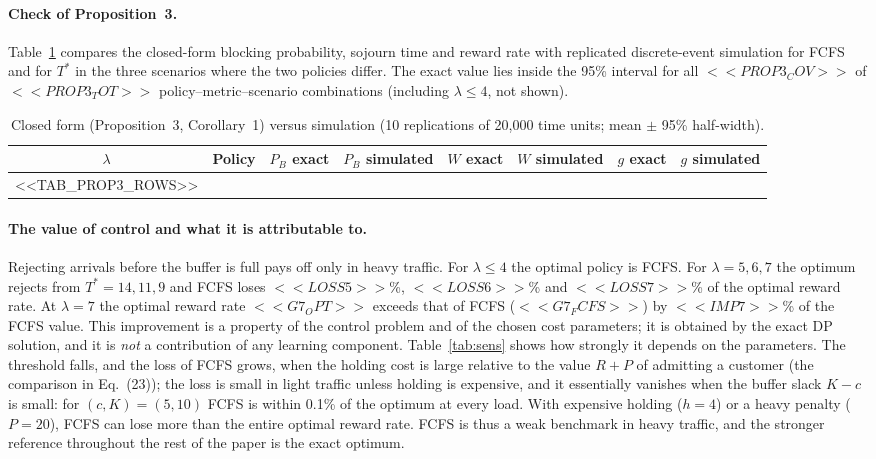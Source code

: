 \paragraph{Check of Proposition~3.} Table~\ref{tab:prop3} compares the closed-form blocking probability, sojourn time and reward rate with replicated discrete-event simulation for FCFS and for $T^*$ in the three scenarios where the two policies differ. The exact value lies inside the 95\% interval for all $<<PROP3_COV>>$ of $<<PROP3_TOT>>$ policy--metric--scenario combinations (including $\lambda\le4$, not shown).

\begin{table}[t]
\centering\small
\caption{Closed form (Proposition~3, Corollary~1) versus simulation (10 replications of 20{,}000 time units; mean $\pm$ 95\% half-width).}\label{tab:prop3}
\begin{tabular}{@{}cl cc cc cc@{}}
\toprule
$\lambda$ & Policy & $P_B$ exact & $P_B$ simulated & $W$ exact & $W$ simulated & $g$ exact & $g$ simulated\\
\midrule
<<TAB_PROP3_ROWS>>
\bottomrule
\end{tabular}
\end{table}

\paragraph{The value of control and what it is attributable to.} Rejecting arrivals before the buffer is full pays off only in heavy traffic. For $\lambda\le4$ the optimal policy is FCFS. For $\lambda=5,6,7$ the optimum rejects from $T^*=14,11,9$ and FCFS loses $<<LOSS5>>$\%, $<<LOSS6>>$\% and $<<LOSS7>>$\% of the optimal reward rate. At $\lambda=7$ the optimal reward rate $<<G7_OPT>>$ exceeds that of FCFS ($<<G7_FCFS>>$) by $<<IMP7>>$\% of the FCFS value. This improvement is a property of the control problem and of the chosen cost parameters; it is obtained by the exact DP solution, and it is \emph{not} a contribution of any learning component. Table~\ref{tab:sens} shows how strongly it depends on the parameters. The threshold falls, and the loss of FCFS grows, when the holding cost is large relative to the value $R+P$ of admitting a customer (the comparison in Eq.~(23)); the loss is small in light traffic unless holding is expensive, and it essentially vanishes when the buffer slack $K-c$ is small: for $(c,K)=(5,10)$ FCFS is within 0.1\% of the optimum at every load. With expensive holding ($h=4$) or a heavy penalty ($P=20$), FCFS can lose more than the entire optimal reward rate. FCFS is thus a weak benchmark in heavy traffic, and the stronger reference throughout the rest of the paper is the exact optimum.

